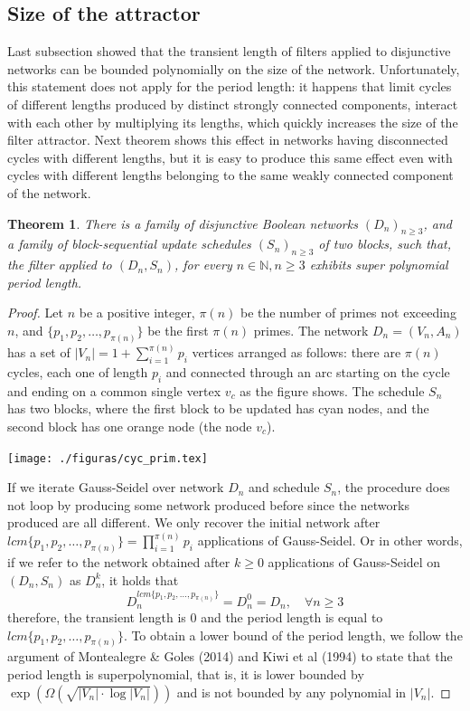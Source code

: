 \documentclass[preprint,12pt]{elsarticle}
\newtheorem {teo}{Theorem}
\begin{document}
\subsection{Size of the attractor}

Last subsection showed that the transient length of filters applied to disjunctive networks can be bounded polynomially on the size of the network. Unfortunately, this statement does not apply for the period length: it happens that limit cycles of different lengths produced by distinct strongly connected components, interact with each other by multiplying its lengths, which quickly increases the size of the filter attractor. Next theorem shows this effect in networks having disconnected cycles with different lengths, but it is easy to produce this same effect even with cycles with different lengths belonging to the same weakly connected component of the network.

\begin{teo}\label{teo-superpol}
There is a family of disjunctive Boolean networks $(D_n)_{n \geq 3}$, and a family of block-sequential update schedules $(S_n)_{n \geq 3}$ of two blocks, such that, the filter applied to $(D_n,S_n)$, for every $n \in \mathbb{N}, n \geq 3$ exhibits super polynomial period length.  
\end{teo}

\begin{proof}
Let $n$ be a positive integer, $\pi(n)$ be the number of primes not exceeding $n$, and $\{p_1,p_2,\ldots,p_{\pi(n)}\}$ be the first $\pi(n)$ primes. The network $D_n=(V_n,A_n)$ has a set of $|V_n|=1+\sum_{i=1}^{\pi(n)} p_i$ vertices arranged as follows: there are $\pi(n)$ cycles, each one of length $p_i$ and connected through an arc starting on the cycle and ending on a common single vertex $v_c$ as the figure shows. The schedule $S_n$ has two blocks, where the first block to be updated has cyan nodes, and the second block has one orange node (the node $v_c$).
\begin{center}
\texttt{[image: ./figuras/cyc\_prim.tex]}
\end{center}
If we iterate Gauss-Seidel over network $D_n$ and schedule $S_n$, the procedure does not loop by producing some network produced before since the networks produced are all different. We only recover the initial network after $lcm\{p_1,p_2,\ldots,p_{\pi(n)}\}=\prod_{i=1}^{\pi(n)} p_i$ applications of Gauss-Seidel. Or in other words, if we refer to the network obtained after $k\geq 0$ applications of Gauss-Seidel on $(D_n,S_n)$ as $D_n^k$, it holds that
\begin{equation}\label{evol-loop}
D_n^{lcm\{p_1,p_2,\ldots,p_{\pi(n)}\}}=D_n^0=D_n, \quad\forall n\geq 3
\end{equation}
therefore, the transient length is $0$ and the period length is equal to $lcm\{p_1,p_2,\ldots,p_{\pi(n)}\}$.
To obtain a lower bound of the period length, we follow the argument of Montealegre \& Goles (2014) \cite{monteal} and Kiwi et al (1994) \cite{Kiwi1994527} to state that the period length is superpolynomial, that is, it is lower bounded by $\exp(\Omega(\sqrt{|V_n|\cdot \log|V_n|}))$ and is not bounded by any polynomial in $|V_n|$.
\end{proof}
\end{document}
